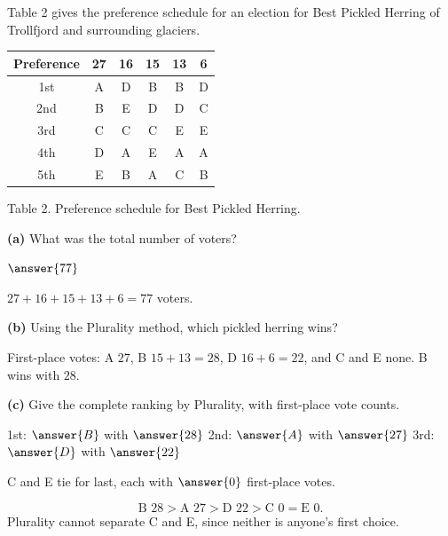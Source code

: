 \documentclass[12pt]{ximera}
\begin{document}
\begin{problem}
Table 2 gives the preference schedule for an election for Best Pickled Herring of
Trollfjord and surrounding glaciers.

\begin{center}
\begin{tabular}{c|ccccc}
Preference & 27 & 16 & 15 & 13 & 6 \\\hline
1st & A & D & B & B & D \\
2nd & B & E & D & D & C \\
3rd & C & C & C & E & E \\
4th & D & A & E & A & A \\
5th & E & B & A & C & B
\end{tabular}

\smallskip
Table 2. Preference schedule for Best Pickled Herring.
\end{center}

\begin{prompt}
\textbf{(a)} What was the total number of voters?

$\answer{77}$

\begin{feedback}
$27+16+15+13+6=77$ voters.
\end{feedback}
\end{prompt}

\begin{prompt}
\textbf{(b)} Using the Plurality method, which pickled herring wins?

\begin{multipleChoice}
\end{multipleChoice}

\begin{feedback}
First-place votes: A $27$, B $15+13=28$, D $16+6=22$, and C and E none. B wins with
$28$.
\end{feedback}
\end{prompt}

\begin{prompt}
\textbf{(c)} Give the complete ranking by Plurality, with first-place vote counts.

1st: $\answer{B}$ with $\answer{28}$ \quad 2nd: $\answer{A}$ with $\answer{27}$ \quad
3rd: $\answer{D}$ with $\answer{22}$

\smallskip
C and E tie for last, each with $\answer{0}$ first-place votes.

\begin{feedback}
\[ \text{B }28 > \text{A }27 > \text{D }22 > \text{C }0 = \text{E }0. \]
Plurality cannot separate C and E, since neither is anyone's first choice.
\end{feedback}
\end{prompt}


\end{problem}
\end{document}
